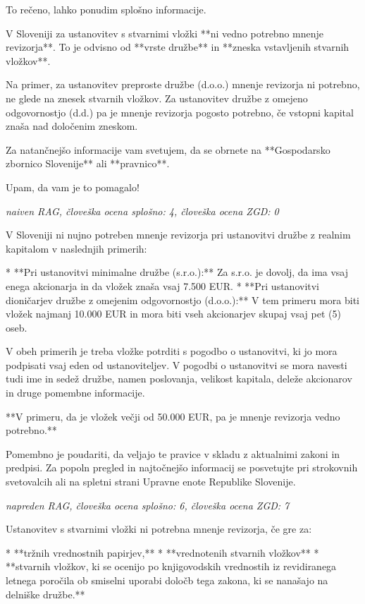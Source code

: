 \documentclass[a4paper,12pt,openright]{book}
\begin{document}
To rečeno, lahko ponudim splošno informacije.

V Sloveniji za ustanovitev s stvarnimi vložki **ni vedno potrebno mnenje revizorja**. To je odvisno od **vrste družbe** in **zneska vstavljenih stvarnih vložkov**.

Na primer, za ustanovitev preproste družbe (d.o.o.)  mnenje revizorja ni potrebno, ne glede na znesek stvarnih vložkov. Za ustanovitev družbe z omejeno odgovornostjo (d.d.) pa je mnenje revizorja pogosto potrebno, če vstopni kapital znaša nad določenim zneskom.

Za natančnejšo informacije vam svetujem, da se obrnete na **Gospodarsko zbornico Slovenije** ali **pravnico**.


Upam, da vam je to pomagalo!

\vspace{0.5cm}
\textit{naiven RAG, človeška ocena splošno: 4, človeška ocena ZGD: 0}

V Sloveniji ni nujno potreben mnenje revizorja pri ustanovitvi družbe z realnim kapitalom v naslednjih primerih:

* **Pri ustanovitvi minimalne družbe (s.r.o.):** Za s.r.o. je dovolj, da ima vsaj enega akcionarja in da vložek znaša vsaj 7.500 EUR.
* **Pri ustanovitvi dioničarjev družbe z omejenim odgovornostjo (d.o.o.):** V tem primeru mora biti vložek najmanj 10.000 EUR in mora biti vseh akcionarjev skupaj vsaj pet (5) oseb.

V obeh primerih je treba vložke potrditi s pogodbo o ustanovitvi, ki jo mora podpisati vsaj eden od ustanoviteljev. V pogodbi o ustanovitvi se mora navesti tudi ime in sedež družbe, namen poslovanja, velikost kapitala, deleže akcionarov in druge pomembne informacije.

**V primeru, da je vložek večji od 50.000 EUR, pa je mnenje revizorja vedno potrebno.**


Pomembno je poudariti, da veljajo te pravice v skladu z aktualnimi zakoni in predpisi. Za popoln pregled in najtočnejšo informacij se posvetujte pri strokovnih svetovalcih ali na spletni strani Upravne enote Republike Slovenije.

\vspace{0.5cm}
\textit{napreden RAG, človeška ocena splošno: 6, človeška ocena ZGD: 7}

Ustanovitev s stvarnimi vložki ni potrebna mnenje revizorja, če gre za:

* **tržnih vrednostnih papirjev,**
* **vrednotenih stvarnih vložkov**
* **stvarnih vložkov, ki se ocenijo po knjigovodskih vrednostih iz revidiranega letnega poročila ob smiselni uporabi določb tega zakona, ki se nanašajo na delniške družbe.**
\end{document}
